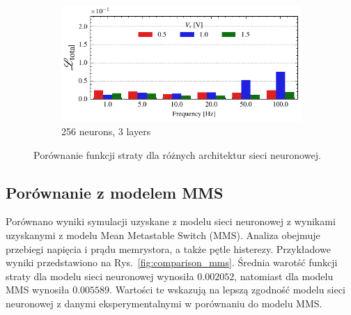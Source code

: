 \documentclass[11pt, oneside]{article}
\begin{document}
\begin{figure}
\begin{subfigure}[c]{0.48\linewidth}
    \end{subfigure}
    \begin{subfigure}[c]{0.48\linewidth}
        \centering
        \includegraphics[width=\linewidth]{sample_results/loss_per_freq_model_silu_256_3_cpu.pdf}
        \caption{256 neurons, 3 layers}

    \end{subfigure}
    \caption{Porównanie funkcji straty dla różnych architektur sieci neuronowej.}
    \label{fig:loss_per_freq}
\end{figure}

\clearpage

\subsection{Porównanie z modelem MMS}

Porównano wyniki symulacji uzyskane z modelu sieci neuronowej z wynikami uzyskanymi z modelu Mean Metastable Switch (MMS). Analiza obejmuje przebiegi napięcia i prądu memrystora, a także pętle histerezy. Przykładowe wyniki przedstawiono na Rys.~\ref{fig:comparison_mms}. Średnia warotść funkcji straty dla modelu sieci neuronowej wynosiła $0.002052$, natomiast dla modelu MMS wynosiła $0.005589$. Wartości te wskazują na lepszą zgodność modelu sieci neuronowej z danymi eksperymentalnymi w porównaniu do modelu MMS.
\end{document}
